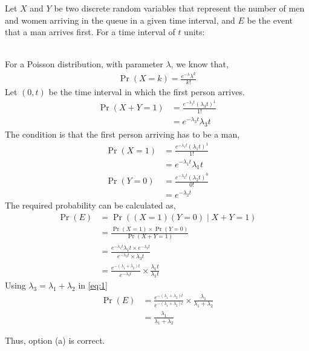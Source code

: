 \documentclass[journal,12pt,twocolumn]{IEEEtran}
\providecommand{\pr}[1]{\ensuremath{\Pr\left(#1\right)}}
\theoremstyle{remark}
\numberwithin{equation}{subsection}
\begin{document}
Let $X$ and $Y$ be two discrete random variables that represent the number of men and women arriving in the queue in a given time interval, and $E$ be the event that a man arrives first. For a time interval of $t$ units: 
\begin{table}[h]
    \centering
    \caption{Outcome of the Experiment}
    \label{tab:my_label}
\end{table}\\
For a Poisson distribution, with parameter $\lambda$, we know that,
\begin{align}
    \pr{X=k} = \frac{e^{-\lambda}{\lambda^{k}}}{k!}
\end{align}
Let $(0,t)$ be the time interval in which the first person arrives.
\begin{align}
    \pr{X+Y=1} &= \frac{e^{-\lambda_3 t}{(\lambda_3 t)^{1}}}{1!}\\
    &= e^{-\lambda_3 t}{\lambda_3 t}
\end{align}
The condition is that the first person arriving has to be a man,
\begin{align}
    \pr{X=1} &= \frac{e^{-\lambda_1 t}{(\lambda_1 t)^{1}}}{1!}\\
    &= e^{-\lambda_1 t}{\lambda_1 t}\\
    \pr{Y=0} &= \frac{e^{-\lambda_2 t}{(\lambda_2 t)^{0}}}{0!}\\
    &= e^{-\lambda_2 t}
\end{align}
The required probability can be calculated as,
\begin{align}
    \pr{E}&=\pr{(X=1)(Y=0)\;\vert{\;X+Y=1}} \\
    &=\frac{\pr{X=1}\times\pr{Y=0}}{\pr{X+Y=1}}\\
    &= \frac{{e^{-\lambda_1 t} \lambda_1 t}\times{e^{-\lambda_2 t}}}{e^{-\lambda_3 t}\times{\lambda_3 t}}\\
    &= \frac{e^{-(\lambda_1+\lambda_2)t}}{e^{-\lambda_3 t}}\times \frac{\lambda_1 t}{\lambda_3 t} \label{eq:1}
\end{align}
Using $\lambda_3=\lambda_1+\lambda_2$ in \eqref{eq:1}
\begin{align}
    \pr{E} &= \frac{e^{-(\lambda_1+\lambda_2)t}}{e^{-(\lambda_1+\lambda_2)t}} \times \frac{\lambda_1}{\lambda_1+\lambda_2}\\
    &= \frac{\lambda_1}{\lambda_1+\lambda_2}
\end{align}

Thus, option (a) is correct.
\end{document}
